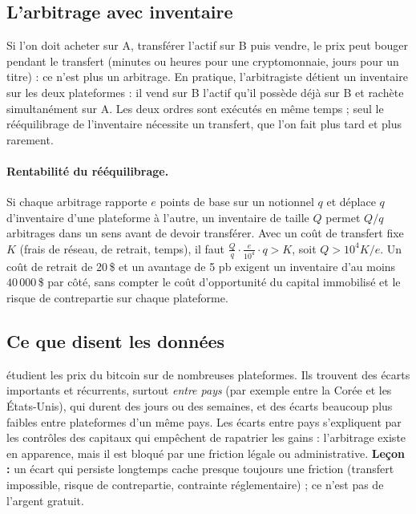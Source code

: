 \subsection{L'arbitrage avec inventaire}

Si l'on doit acheter sur A, transférer l'actif sur B puis vendre, le prix peut bouger pendant le transfert (minutes ou heures pour une cryptomonnaie, jours pour un titre) : ce n'est plus un arbitrage. En pratique, l'arbitragiste détient un inventaire sur les deux plateformes : il vend sur B l'actif qu'il possède déjà sur B et rachète simultanément sur A. Les deux ordres sont exécutés en même temps ; seul le rééquilibrage de l'inventaire nécessite un transfert, que l'on fait plus tard et plus rarement.

\paragraph{Rentabilité du rééquilibrage.} Si chaque arbitrage rapporte $e$ points de base sur un notionnel $q$ et déplace $q$ d'inventaire d'une plateforme à l'autre, un inventaire de taille $Q$ permet $Q/q$ arbitrages dans un sens avant de devoir transférer. Avec un coût de transfert fixe $K$ (frais de réseau, de retrait, temps), il faut $\frac Qq\cdot\frac{e}{10^4}\cdot q > K$, soit $Q > 10^4K/e$. Un coût de retrait de 20\,\$ et un avantage de 5 pb exigent un inventaire d'au moins $40\,000$\,\$ par côté, sans compter le coût d'opportunité du capital immobilisé et le risque de contrepartie sur chaque plateforme.

\subsection{Ce que disent les données}

\citet{makarov2020} étudient les prix du bitcoin sur de nombreuses plateformes. Ils trouvent des écarts importants et récurrents, surtout \emph{entre pays} (par exemple entre la Corée et les États-Unis), qui durent des jours ou des semaines, et des écarts beaucoup plus faibles entre plateformes d'un même pays. Les écarts entre pays s'expliquent par les contrôles des capitaux qui empêchent de rapatrier les gains : l'arbitrage existe en apparence, mais il est bloqué par une friction légale ou administrative. \textbf{Leçon :} un écart qui persiste longtemps cache presque toujours une friction (transfert impossible, risque de contrepartie, contrainte réglementaire) ; ce n'est pas de l'argent gratuit.

